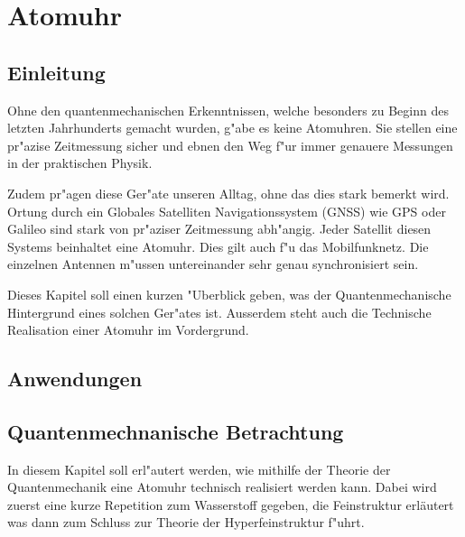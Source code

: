 \chapter{Atomuhr\label{chapter:atomuhr}}
\begin{refsection}

\section{Einleitung}
%

Ohne den quantenmechanischen Erkenntnissen, welche besonders zu Beginn des letzten Jahrhunderts gemacht wurden, g"abe es keine Atomuhren. 
Sie stellen eine pr"azise Zeitmessung sicher und ebnen den Weg f"ur immer genauere Messungen in der praktischen Physik. 

Zudem pr"agen diese Ger"ate unseren Alltag, ohne das dies stark bemerkt wird. 
Ortung durch ein Globales Satelliten Navigationssystem (GNSS) wie GPS oder Galileo sind stark von pr"aziser Zeitmessung abh"angig. 
Jeder Satellit diesen Systems beinhaltet eine Atomuhr.
Dies gilt auch f"u das Mobilfunknetz. Die einzelnen Antennen m"ussen untereinander sehr genau synchronisiert sein. 

Dieses Kapitel soll einen kurzen "Uberblick geben, was der Quantenmechanische Hintergrund eines solchen Ger"ates ist. Ausserdem steht auch die Technische Realisation einer Atomuhr im Vordergrund.
\section{Anwendungen}

\section{Quantenmechnanische Betrachtung}

In diesem Kapitel soll erl"autert werden, wie mithilfe der Theorie der Quantenmechanik eine Atomuhr technisch realisiert werden kann. Dabei wird zuerst eine kurze Repetition zum Wasserstoff gegeben, die Feinstruktur erläutert was dann zum Schluss zur Theorie der Hyperfeinstruktur f"uhrt.


\end{refsection}
